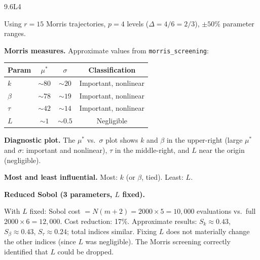 \begin{solution}{9.6}{L4}

\solanswer

Using $r = 15$ Morris trajectories, $p = 4$ levels ($\Delta = 4/6 = 2/3$),
$\pm50\%$ parameter ranges.

 \textbf{Morris measures.} Approximate values from \texttt{morris\_screening}:
\begin{center}
\begin{tabular}{lccc}
\toprule
Param & $\mu^*$ & $\sigma$ & Classification \\
\midrule
$k$     & $\sim 80$ & $\sim 20$ & Important, nonlinear \\
$\beta$ & $\sim 78$ & $\sim 19$ & Important, nonlinear \\
$\tau$  & $\sim 42$ & $\sim 14$ & Important, nonlinear \\
$L$     & $\sim 1$  & $\sim 0.5$& Negligible \\
\bottomrule
\end{tabular}
\end{center}

 \textbf{Diagnostic plot.}
The $\mu^*$ vs.\ $\sigma$ plot shows $k$ and $\beta$ in the upper-right
(large $\mu^*$ and $\sigma$: important and nonlinear), $\tau$ in the
middle-right, and $L$ near the origin (negligible).

 \textbf{Most and least influential.}
Most: $k$ (or $\beta$, tied). Least: $L$.

 \textbf{Reduced Sobol (3 parameters, $L$ fixed).}

With $L$ fixed: Sobol cost $= N(m+2) = 2000\times5 = 10{,}000$ evaluations
vs.\ full $2000\times6 = 12{,}000$. Cost reduction: 17\%.
Approximate results: $S_k \approx 0.43$, $S_\beta \approx 0.43$, $S_\tau \approx 0.24$;
total indices similar. Fixing $L$ does not materially change the other
indices (since $L$ was negligible). The Morris screening correctly identified
that $L$ could be dropped.


\end{solution}

